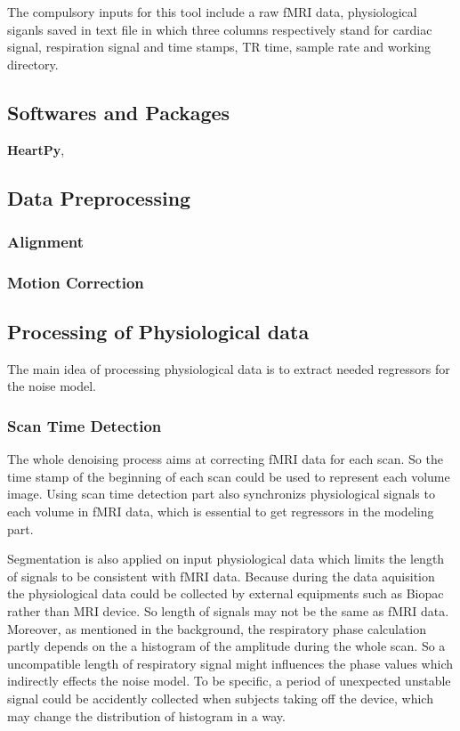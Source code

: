 The compulsory inputs for this tool include a raw fMRI data, 
physiological siganls saved in text file in which three columns respectively stand for cardiac signal, 
respiration signal and time stamps,
TR time, sample rate and working directory.

\subsection{Softwares and Packages}
\textbf{HeartPy}\cite{van2019heartpy},

\subsection{Data Preprocessing}
\subsubsection{Alignment}
\subsubsection{Motion Correction}

\subsection{Processing of Physiological data}
The main idea of processing physiological data is to extract needed regressors for the noise model.

\subsubsection{Scan Time Detection}
The whole denoising process aims at correcting fMRI data for each scan. 
So the time stamp of the beginning of each scan could be used to represent each volume image. 
Using scan time detection part also synchronizs physiological signals to each volume in fMRI data,
which is essential to get regressors in the modeling part.

Segmentation is also applied on input physiological data which
limits the length of signals to be consistent with fMRI data. Because during the data aquisition the physiological
data could be collected by external equipments such as Biopac rather than MRI device.
So length of signals may not be the same as fMRI data. Moreover, as mentioned in the background, the respiratory phase calculation 
partly depends on the a histogram of the amplitude during the whole scan. So a uncompatible length of 
respiratory signal might influences the phase values which indirectly effects the noise model. To be specific, 
a period of unexpected unstable signal could be accidently collected when subjects taking off the 
device, which may change the distribution of histogram in a way.

